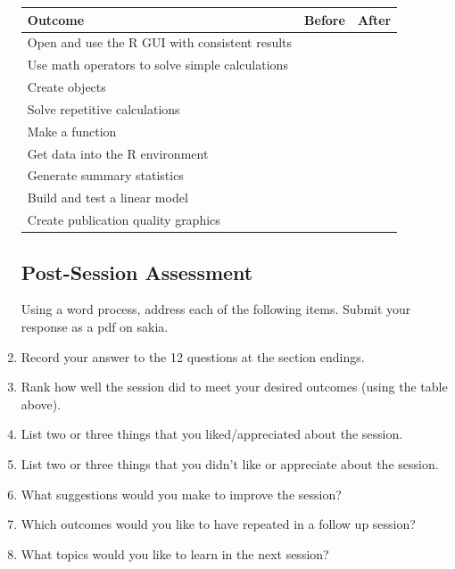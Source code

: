 \documentclass{tufte-handout}\usepackage[]{graphicx}\usepackage[]{xcolor}
\begin{document}
\begin{fullwidth}
\begin{enumerate}
\begin{table}
		\begin{tabular}{|l|l|l|} \toprule
Outcome						& Before & After \\ \midrule
Open and use the R GUI with consistent results 		&& \\
Use math operators to solve simple calculations		&& \\
Create objects																		& &\\
Solve repetitive calculations										&	& \\
Make a function																		&& \\
Get data into the R environment										&& \\
Generate summary statistics												& &\\
Build and test a linear model										&	& \\
Create publication quality graphics								&& \\
		\bottomrule
		\end{tabular}
\end{table}

\subsection{Post-Session Assessment}

Using a word process, address each of the following items. Submit your response as a pdf on sakia. 

\item Record your answer to the 12 questions at the section endings.

\item Rank how well the session did to meet your desired outcomes (using the table above).

\item List two or three things that you liked/appreciated about the session.

\vspace{.7in}

\item List two or three things that you didn't like or appreciate about the session.



\vspace{.7in}
\item What suggestions would you make to improve the session?

\vspace{.7in}
\item Which outcomes would you like to have repeated in a follow up session?
\vspace{.7in}


\item What topics would you like to learn in the next session?

\end{enumerate}
\end{fullwidth}
\end{document}
